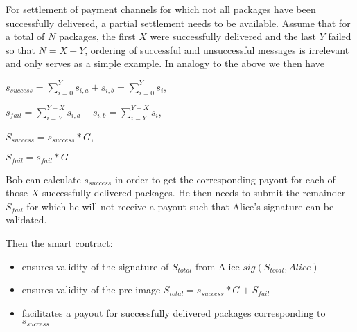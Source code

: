 For settlement of payment channels for which not all packages have been successfully delivered, a partial settlement needs to be available. Assume that for a total of $N$ packages, the first $X$ were successfully delivered and the last $Y$ failed so that $N = X + Y$, ordering of successful and unsuccessful messages is irrelevant and only serves as a simple example. In analogy to the above we then have

$s_{success} = \sum_{i=0}^{Y} s_{i,a} + s_{i,b} = \sum_{i=0}^{Y} s_i$,

$s_{fail} = \sum_{i=Y}^{Y+X} s_{i,a} + s_{i,b} = \sum_{i=Y}^{Y+X} s_i$,

$S_{success} = s_{success} * G$,

$S_{fail} = s_{fail} * G$

Bob can calculate $s_{success}$ in order to get the corresponding payout for each of those $X$ successfully delivered packages. He then needs to submit the remainder $S_{fail}$ for which he will not receive a payout such that Alice's signature can be validated.

Then the smart contract:
\begin{itemize}
    \item ensures validity of the signature of $S_{total}$ from Alice $sig(S_{total}, Alice)$
    \item ensures validity of the pre-image $S_{total} = s_{success} * G + S_{fail}$
    \item facilitates a payout for successfully delivered packages corresponding to $s_{success}$
\end{itemize}